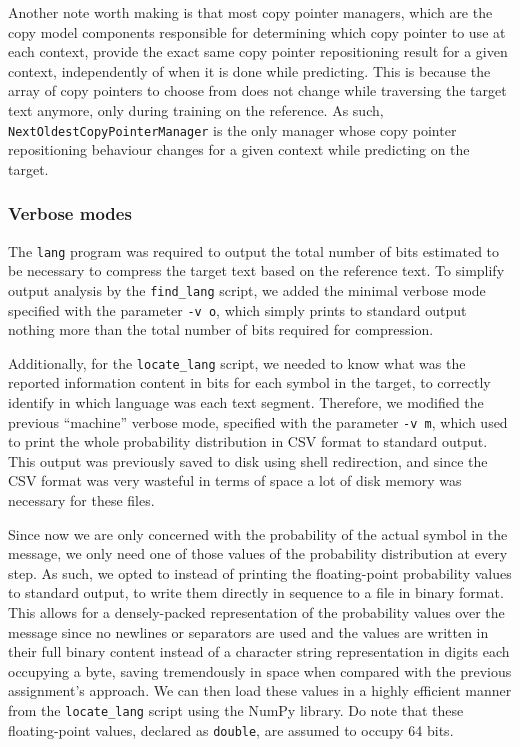\documentclass{article}
\begin{document}
Another note worth making is that most copy pointer managers, which are the copy model components responsible for determining which copy pointer to use at each context, provide the exact same copy pointer repositioning result for a given context, independently of when it is done while predicting.
This is because the array of copy pointers to choose from does not change while traversing the target text anymore, only during training on the reference.
As such, \texttt{NextOldestCopyPointerManager} is the only manager whose copy pointer repositioning behaviour changes for a given context while predicting on the target.

\subsubsection{Verbose modes}
\label{subsubsec:methodology_lang_model_verbose}

The \texttt{lang} program was required to output the total number of bits estimated to be necessary to compress the target text based on the reference text.
To simplify output analysis by the \texttt{find_lang} script, we added the minimal verbose mode specified with the parameter \texttt{-v o}, which simply prints to standard output nothing more than the total number of bits required for compression.

Additionally, for the \texttt{locate_lang} script, we needed to know what was the reported information content in bits for each symbol in the target, to correctly identify in which language was each text segment.
Therefore, we modified the previous ``machine'' verbose mode, specified with the parameter \texttt{-v m}, which used to print the whole probability distribution in CSV format to standard output.
This output was previously saved to disk using shell redirection, and since the CSV format was very wasteful in terms of space a lot of disk memory was necessary for these files.

Since now we are only concerned with the probability of the actual symbol in the message, we only need one of those values of the probability distribution at every step.
As such, we opted to instead of printing the floating-point probability values to standard output, to write them directly in sequence to a file in binary format.
This allows for a densely-packed representation of the probability values over the message since no newlines or separators are used and the values are written in their full binary content instead of a character string representation in digits each occupying a byte, saving tremendously in space when compared with the previous assignment's approach.
We can then load these values in a highly efficient manner from the \texttt{locate_lang} script using the NumPy library.
Do note that these floating-point values, declared as \texttt{double}, are assumed to occupy 64 bits.
\end{document}
